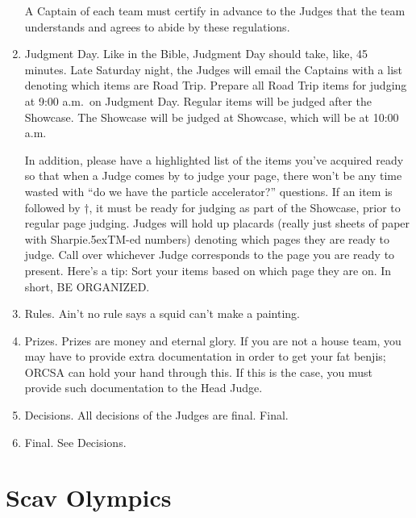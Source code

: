 \documentclass{book}
\def\tm{\raise.5ex\hbox{\scriptsize TM}}
\begin{document}
\begin{enumerate}
 A Captain of each team must certify in advance to the Judges that the
   team understands and agrees to abide by these regulations.
   
\item Judgment Day.
Like in the Bible, Judgment Day should take, like, 45 minutes. Late Saturday night, the Judges will email the Captains with a list denoting which items are Road Trip. Prepare all Road Trip items for judging at 9:00 a.m.\ on Judgment Day. Regular items will be judged after the Showcase. The Showcase will be judged at Showcase, which will be at 10:00 a.m.

In addition, please have a highlighted list of the items you've acquired ready so that when a Judge comes by to judge your page, there won't be any time wasted with ``do we have the particle accelerator?'' questions. If an item is followed by $\dagger$, it must be ready for judging as part of the Showcase, prior to regular page judging. Judges will hold up placards (really just sheets of paper with Sharpie\tm-ed numbers) denoting which pages they are ready to judge.  Call over whichever Judge corresponds to the page you are ready to present.  Here's a tip:  Sort your items based on which page they are on. In short, BE ORGANIZED.

\item Rules. Ain't no rule says a squid can't make a painting.

\setcounter{enumi}{13}

\item Prizes. Prizes are money and eternal glory. If you are not a house team, you may have to provide extra documentation in order to get your fat benjis; ORCSA can hold your hand through this.  If this is the case, you must provide such documentation to the Head Judge.

\item Decisions. All decisions of the Judges are final. Final.

\item Final. See Decisions.

\end{enumerate}

\newpage
\setcounter{page}{1}
\pagestyle{empty}



\section*{Scav Olympics}
\end{document}
